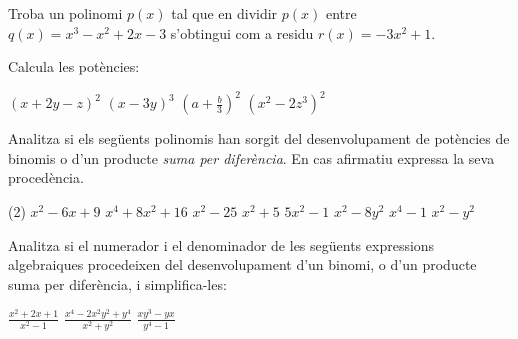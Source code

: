\begin{activitats}
\begin{mylist}

\exer  Troba un polinomi $p(x)$ tal que en dividir $p(x)$ entre $q(x)=x^{3} -x^{2} +2x-3$ s'obtingui com a residu $r(x)=-3x^{2} +1$.  



\exer  Calcula les potències: 
\begin{tasks}
	\task  $(x+2y-z)^{2} $  
	\task  $(x-3y)^{3} $  
	\task  $\left(\left. a+\frac{b}{3} \right)\right. ^{2} $  
	\task  $(x^{2} -2z^{3} )^{2} $
\end{tasks}



\exer  Analitza si els següents polinomis han sorgit del desenvolupament de potències de binomis o d'un producte \textit{suma per diferència}. En cas afirmatiu expressa la seva procedència.   

\begin{tasks}(2)
 	\task $x^{2} -6x+9$    
	\task  $x^{4} +8x^{2} +16$   
	\task  $x^{2} -25$   
 	\task $x^{2} +5$     
	\task $5x^{2} -1$   
	\task $x^{2} -8y^{2} $    
 	\task $x^{4} -1$     
	\task $x^{2} -y^{2} $    
\end{tasks}

\answers[cols=2]{[$(x-3)^2$, $(x^2+4)^2$, $(x+5)(x-5)$, $x^2+5$, $(\sqrt{5}x+1)(\sqrt{5}x-1)$, $(x+\sqrt{8}y)(x-\sqrt{8}y)$, $(x^2+1)(x^2-1)=(x^2+1)(x+1)(x-1)$, $(x+y)(x-y)$, $(x+\sqrt{2}yz)(x-\sqrt{2}yz)$]}


\exer  Analitza si el numerador i el denominador de les següents expressions algebraiques procedeixen del desenvolupament d'un binomi, o d'un producte suma per diferència, i simplifica-les:

\begin{tasks}
\task  $\frac{x^{2} +2x+1}{x^{2} -1} $   \task  $\frac{x^{4} -2x^{2} y^{2} +y^{4} }{x^{2} +y^{2} } $    \task  $\frac{xy^{3} -yx}{y^{4} -1} $
\end{tasks}

\answers[cols=1]{[$\frac{(x+1)^2}{(x+1)(x-1)}=\frac{x+1}{x-1}$, $\frac{(x^2-y^2)^2}{x^2+y^2}$, $\frac{xy(y^2-1)}{(y^2+1)(y^2-1)}=\frac{xy}{y^2+1}$]}



\end{mylist}
\end{activitats}
